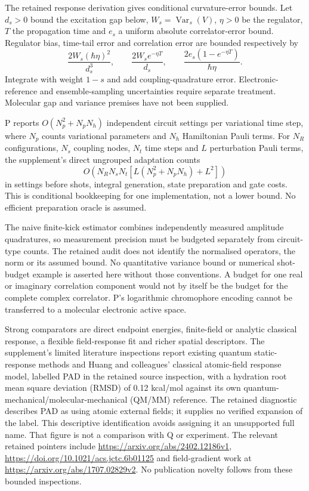 \documentclass{article}
\begin{document}
The retained response derivation gives conditional curvature-error bounds. Let $d_s>0$ bound the excitation gap below, $W_s=\operatorname{Var}_s(V)$, $\eta>0$ be the regulator, $T$ the propagation time and $e_s$ a uniform absolute correlator-error bound. Regulator bias, time-tail error and correlation error are bounded respectively by
\begin{equation*}
\frac{2W_s(\hbar\eta)^2}{d_s^3},\qquad
\frac{2W_s e^{-\eta T}}{d_s},\qquad
\frac{2e_s(1-e^{-\eta T})}{\hbar\eta}.
\end{equation*}
Integrate with weight $1-s$ and add coupling-quadrature error. Electronic-reference and ensemble-sampling uncertainties require separate treatment. Molecular gap and variance premises have not been supplied.

P reports $O(N_p^2+N_pN_h)$ independent circuit settings per variational time step, where $N_p$ counts variational parameters and $N_h$ Hamiltonian Pauli terms. For $N_R$ configurations, $N_s$ coupling nodes, $N_t$ time steps and $L$ perturbation Pauli terms, the supplement's direct ungrouped adaptation counts
\begin{equation*}
O\left(N_RN_sN_t\left[L(N_p^2+N_pN_h)+L^2\right]\right)
\end{equation*}
in settings before shots, integral generation, state preparation and gate costs. This is conditional bookkeeping for one implementation, not a lower bound. No efficient preparation oracle is assumed.

The naive finite-kick estimator combines independently measured amplitude quadratures, so measurement precision must be budgeted separately from circuit-type counts. The retained audit does not identify the normalised operators, the norm or its assumed bound. No quantitative variance bound or numerical shot-budget example is asserted here without those conventions. A budget for one real or imaginary correlation component would not by itself be the budget for the complete complex correlator. P's logarithmic chromophore encoding cannot be transferred to a molecular electronic active space.

Strong comparators are direct endpoint energies, finite-field or analytic classical response, a flexible field-response fit and richer spatial descriptors. The supplement's limited literature inspections report existing quantum static-response methods and Huang and colleagues' classical atomic-field response model, labelled PAD in the retained source inspection, with a hydration root mean square deviation (RMSD) of 0.12 kcal/mol against its own quantum-mechanical/molecular-mechanical (QM/MM) reference. The retained diagnostic describes PAD as using atomic external fields; it supplies no verified expansion of the label. This descriptive identification avoids assigning it an unsupported full name. That figure is not a comparison with Q or experiment. The relevant retained pointers include \url{https://arxiv.org/abs/2402.12186v1}, \url{https://doi.org/10.1021/acs.jctc.6b01125} and field-gradient work at \url{https://arxiv.org/abs/1707.02829v2}. No publication novelty follows from these bounded inspections.
\end{document}
